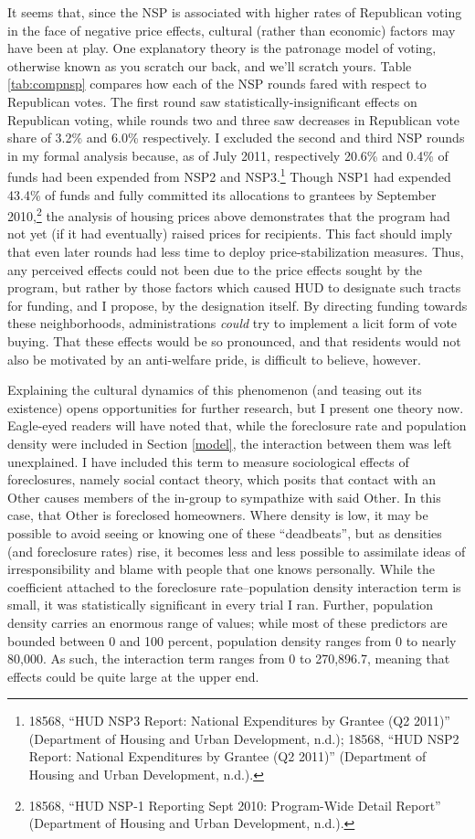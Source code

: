 \documentclass[12pt,oneside]{psthesis}
\begin{document}
It seems that, since the NSP is associated with higher rates of Republican voting in the face of negative price effects, cultural (rather than economic) factors may have been at play.
One explanatory theory is the patronage model of voting, otherwise known as you scratch our back, and we'll scratch yours.
Table \ref{tab:compnsp} compares how each of the NSP rounds fared with respect to Republican votes.
The first round saw statistically-insignificant effects on Republican voting, while rounds two and three saw decreases in Republican vote share of 3.2\% and 6.0\% respectively.
I excluded the second and third NSP rounds in my formal analysis because, as of July 2011, respectively 20.6\% and 0.4\% of funds had been expended from NSP2 and NSP3.\footnote{18568, ``HUD NSP3 Report: National Expenditures by Grantee (Q2 2011)'' (Department of Housing and Urban Development, n.d.); 18568, ``HUD NSP2 Report: National Expenditures by Grantee (Q2 2011)'' (Department of Housing and Urban Development, n.d.).}
Though NSP1 had expended 43.4\% of funds and fully committed its allocations to grantees by September 2010,\footnote{18568, ``HUD NSP-1 Reporting Sept 2010: Program-Wide Detail Report'' (Department of Housing and Urban Development, n.d.).} the analysis of housing prices above demonstrates that the program had not yet (if it had eventually) raised prices for recipients.
This fact should imply that even later rounds had less time to deploy price-stabilization measures.
Thus, any perceived effects could not been due to the price effects sought by the program, but rather by those factors which caused HUD to designate such tracts for funding, and I propose, by the designation itself.
By directing funding towards these neighborhoods, administrations \emph{could} try to implement a licit form of vote buying.
That these effects would be so pronounced, and that residents would not also be motivated by an anti-welfare pride, is difficult to believe, however.

Explaining the cultural dynamics of this phenomenon (and teasing out its existence) opens opportunities for further research, but I present one theory now.
Eagle-eyed readers will have noted that, while the foreclosure rate and population density were included in Section \ref{model}, the interaction between them was left unexplained.
I have included this term to measure sociological effects of foreclosures, namely social contact theory, which posits that contact with an Other causes members of the in-group to sympathize with said Other.
In this case, that Other is foreclosed homeowners.
Where density is low, it may be possible to avoid seeing or knowing one of these ``deadbeats'', but as densities (and foreclosure rates) rise, it becomes less and less possible to assimilate ideas of irresponsibility and blame with people that one knows personally.
While the coefficient attached to the foreclosure rate--population density interaction term is small, it was statistically significant in every trial I ran.
Further, population density carries an enormous range of values; while most of these predictors are bounded between 0 and 100 percent, population density ranges from 0 to nearly 80,000.
As such, the interaction term ranges from 0 to 270,896.7, meaning that effects could be quite large at the upper end.
\end{document}
